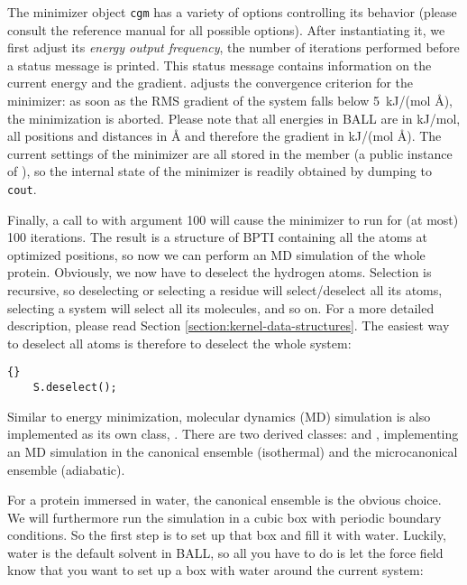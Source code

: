 \noindent
The minimizer object {\tt cgm} has a variety of options controlling its
behavior (please consult the reference manual for all possible options).
After instantiating it, we first adjust its {\em energy output frequency},
\ie the number of iterations performed before a status message is printed.
This status message contains information on the current energy and the
gradient.  adjusts the convergence criterion for the
minimizer: as soon as the RMS gradient of the system falls below 5~kJ/(mol
\AA), the minimization is aborted. Please note that all energies in BALL
are in kJ/mol, all positions and distances in {\AA} and therefore the gradient
in kJ/(mol \AA). The current settings of the minimizer are all stored in 
the member  (a public instance of 
), so the internal state of the minimizer is readily obtained by
dumping  to {\tt cout}.

Finally, a call to  with argument 100 will cause the
minimizer to run for
(at most) 100 iterations. The result is a structure of BPTI containing all
the atoms at optimized positions, so now we can perform an MD simulation of
the whole protein. Obviously, we now have to deselect the hydrogen atoms.
Selection is recursive, so deselecting or selecting a residue will
select/deselect all its atoms, selecting a system will select all its
molecules, and so on. For a more detailed description, please read Section
\ref{section:kernel-data-structures}. The easiest way to deselect all atoms is
therefore to deselect the whole system:

\begin{lstlisting}{}
	S.deselect();
\end{lstlisting}

\noindent
Similar to energy minimization, molecular dynamics (MD) simulation is also
implemented as its own class, . There are two derived
classes:  and , implementing an MD
simulation in the canonical ensemble (isothermal) and the microcanonical
ensemble (adiabatic). 

For a protein immersed in water, the canonical ensemble is the obvious choice.
We will furthermore run the simulation in a cubic box with periodic boundary 
conditions. So the first step is to set up that box and fill it with water.
Luckily, water is the default solvent in BALL, so all you have to do is
let the force field know that you want to set up a box with water around the
current system:

